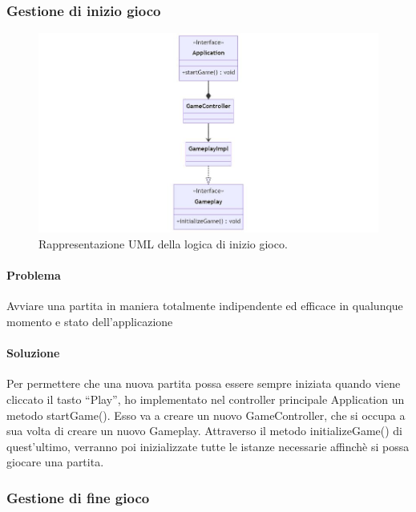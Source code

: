 \documentclass[a4paper,12pt]{report}
\begin{document}
\subsubsection{Gestione di inizio gioco}

\begin{figure}[H]
\centering{}
\includegraphics[width=\textwidth]{img/iniziogioco.jpg}
\caption{Rappresentazione UML della logica di inizio gioco.}
\end{figure}

\paragraph{Problema} Avviare una partita in maniera totalmente indipendente ed efficace in qualunque momento e stato dell’applicazione

\paragraph{Soluzione} Per permettere che una nuova partita possa essere sempre iniziata quando viene cliccato il tasto “Play”, ho implementato nel controller principale Application un metodo startGame(). Esso va a creare un nuovo GameController, che si occupa a sua volta di creare un nuovo Gameplay. Attraverso il metodo initializeGame() di quest’ultimo, verranno poi inizializzate tutte le istanze necessarie affinchè si possa giocare una partita.

\subsubsection{Gestione di fine gioco}
\end{document}

